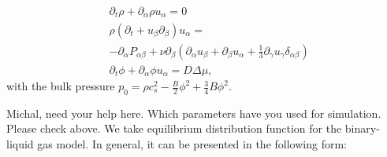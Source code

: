 \documentclass[mathpazo]{cicp}
\begin{document}
\begin{equation}
\begin{aligned}
&\partial_t \rho+ \partial_{\alpha} \rho u_{\alpha}=0\\
&\rho\left(\partial_t+u_{\beta}\partial_{\beta}\right) u_{\alpha}=\\
&-\partial_{\alpha}P_{\alpha \beta} + \nu\partial_{\beta}\left(\partial_{\alpha}u_{\beta}+\partial_{\beta} u_{\alpha} + \frac{1}{3}\partial_{\gamma} u_{\gamma} \delta_{\alpha\beta}\right)\\
&\partial_t \phi + \partial_{\alpha} \phi u_{\alpha}=D\Delta \mu,
\end{aligned}
\label{binary:fluid:system}
\end{equation}
with the bulk pressure $p_0=\rho c_s^2-\frac{B}{2}\phi^2+\frac{3}{4}B \phi^2$.

{\color{red} Michal, need your help here. Which parameters have you used for simulation. Please check above.}
We take equilibrium distribution function for the binary-liquid gas model. In general, it can be presented in the following form:




\end{document}

